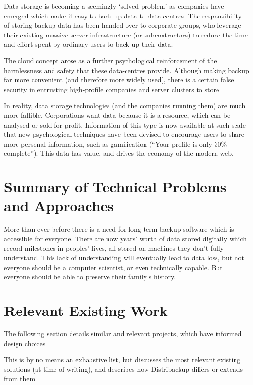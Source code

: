 \documentclass[12pt,a4paper,]{adreport}
\begin{document}
Data storage is becoming a seemingly `solved problem' as companies have emerged which make it easy to back-up data to data-centres. The responsibility of storing backup data has been handed over to corporate groups, who leverage their existing massive server infrastructure (or
subcontractors) to reduce the time and effort spent by ordinary users to
back up their data. 

The cloud concept arose as a further psychological reinforcement of the harmlessness and safety that these data-centres provide. Although making backup far more convenient (and therefore more widely used), there is a certain false security in entrusting high-profile companies and server clusters to store 

In reality, data storage technologies (and the companies running them)
are much more fallible. Corporations want data because it is a resource,
which can be analysed or sold for profit. Information of this type is
now available at such scale that new psychological techniques have been
devised to encourage users to share more personal information, such as
gamification (``Your profile is only 30\% complete''). This data has
value, and drives the economy of the modern web.

\section{Summary of Technical Problems and
Approaches}\label{summary-of-technical-problems-and-approaches}

More than ever before there is a need for long-term backup software
which is accessible for everyone. There are now years' worth of data
stored digitally which record milestones in peoples' lives, all stored
on machines they don't fully understand. This lack of understanding will
eventually lead to data loss, but not everyone should be a computer
scientist, or even technically capable. But everyone should be able to
preserve their family's history.

\section{Relevant Existing Work}\label{relevant-existing-work}

The following section details similar and relevant projects, which have
informed design choices

This is by no means an exhaustive list, but discusses the most relevant
existing solutions (at time of writing), and describes how Distribackup
differs or extends from them.
\end{document}
